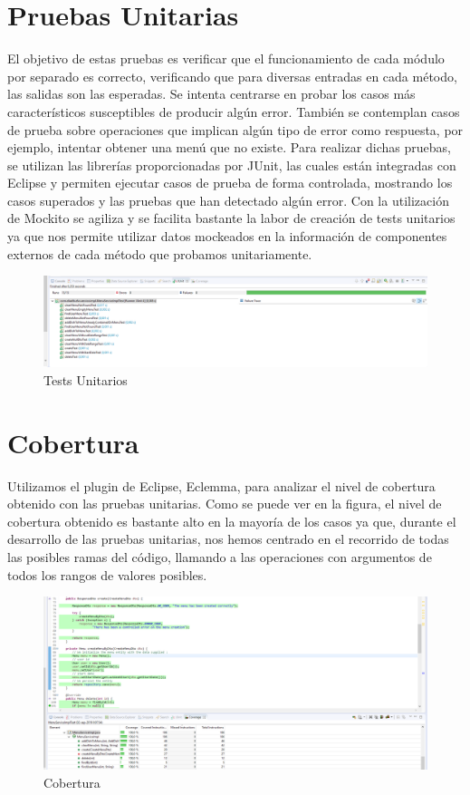 \documentclass[12pt, a4paper, twoside]{book}
\begin{document}
	\section{Pruebas Unitarias}
	El objetivo de estas pruebas es verificar que el funcionamiento de cada módulo por separado es correcto, verificando que para diversas entradas en cada método, las salidas son las esperadas. Se intenta centrarse en probar los casos más característicos susceptibles de producir algún error. También se contemplan casos de prueba sobre operaciones que implican algún tipo de error como respuesta, por ejemplo, intentar obtener una menú que no existe. Para realizar dichas pruebas, se utilizan las librerías proporcionadas por JUnit, las cuales están integradas con Eclipse y permiten ejecutar casos de prueba de forma controlada, mostrando los casos superados y las pruebas que han detectado algún error. Con la utilización de Mockito se agiliza y se facilita bastante la labor de creación de tests unitarios ya que nos permite utilizar datos mockeados en la información de componentes externos de cada método que probamos unitariamente.
	\begin{figure}[H]
		\centering
		\includegraphics[width=15cm]{Imagenes/Tests.png}
		\caption{Tests Unitarios}\label{Tests Unitarios}
	\end{figure}
	\section{Cobertura}
	Utilizamos el plugin de Eclipse, Eclemma, para analizar el nivel de cobertura obtenido con las pruebas unitarias.
	Como se puede ver en la figura, el nivel de cobertura obtenido es bastante alto en la mayoría de los casos ya que, durante el desarrollo de las pruebas unitarias, nos hemos centrado en el recorrido de todas las posibles ramas del código, llamando a las operaciones con argumentos de todos los rangos de valores posibles.
	\begin{figure}[H]
		\centering
		\includegraphics[width=15cm]{Imagenes/Cobertura.png}
		\caption{Cobertura}\label{Cobertura}
	\end{figure}
\end{document}
